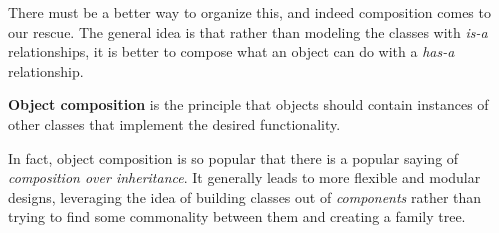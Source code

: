   There must be a better way to organize this, and indeed composition comes to our rescue. The general idea is that rather than modeling the classes with \textit{is-a} relationships, it is better to compose what an object can do with a \textit{has-a} relationship. 

  \begin{definition}
    \textbf{Object composition} is the principle that objects should contain instances of other classes that implement the desired functionality. 
  \end{definition} 

  \begin{definition}[Delegation]
    
  \end{definition}

  In fact, object composition is so popular that there is a popular saying of \textit{composition over inheritance}. It generally leads to more flexible and modular designs, leveraging the idea of building classes out of \textit{components} rather than trying to find some commonality between them and creating a family tree. 


